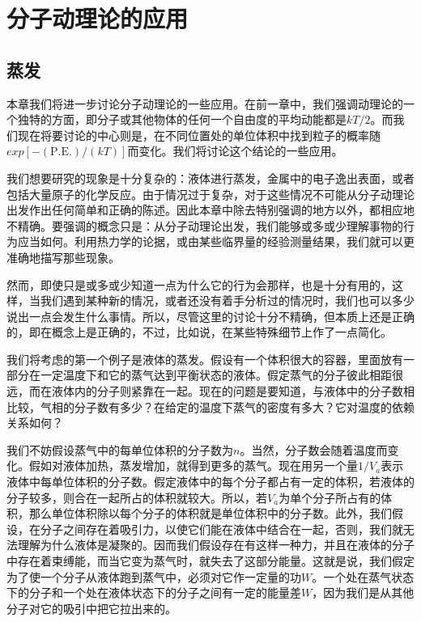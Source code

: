 \chapter{分子动理论的应用}

\section{蒸发}

本章我们将进一步讨论分子动理论的一些应用。在前一章中，我们强调动理论的一个独特的方面，即分子或其他物体的任何一个自由度的平均动能都是$kT/2$。而我们现在将要讨论的中心则是，在不同位置处的单位体积中找到粒子的概率随$exp[-(\text{P.E.})/(kT)]$而变化。我们将讨论这个结论的一些应用。

我们想要研究的现象是十分复杂的：液体进行蒸发，金属中的电子逸出表面，或者包括大量原子的化学反应。由于情况过于复杂，对于这些情况不可能从分子动理论出发作出任何简单和正确的陈述。因此本章中除去特别强调的地方以外，都相应地不精确。要强调的概念只是：从分子动理论出发，我们能够或多或少理解事物的行为应当如何。利用热力学的论据，或由某些临界量的经验测量结果，我们就可以更准确地描写那些现象。

然而，即使只是或多或少知道一点为什么它的行为会那样，也是十分有用的，这样，当我们遇到某种新的情况，或者还没有着手分析过的情况时，我们也可以多少说出一点会发生什么事情。所以，尽管这里的讨论十分不精确，但本质上还是正确的，即在概念上是正确的，不过，比如说，在某些特殊细节上作了一点简化。

我们将考虑的第一个例子是液体的蒸发。假设有一个体积很大的容器，里面放有一部分在一定温度下和它的蒸气达到平衡状态的液体。假定蒸气的分子彼此相距很远，而在液体内的分子则紧靠在一起。现在的问题是要知道，与液体中的分子数相比较，气相的分子数有多少？在给定的温度下蒸气的密度有多大？它对温度的依赖关系如何？

我们不妨假设蒸气中的每单位体积的分子数为$n$。当然，分子数会随着温度而变化。假如对液体加热，蒸发增加，就得到更多的蒸气。现在用另一个量$1/V_a$表示液体中每单位体积的分子数。假定液体中的每个分子都占有一定的体积，若液体的分子较多，则合在一起所占的体积就较大。所以，若$V_a$为单个分子所占有的体积，那么单位体积除以每个分子的体积就是单位体积中的分子数。此外，我们假设，在分子之间存在着吸引力，以使它们能在液体中结合在一起，否则，我们就无法理解为什么液体是凝聚的。因而我们假设存在有这样一种力，并且在液体的分子中存在着束缚能，而当它变为蒸气时，就失去了这部分能量。这就是说，我们假定为了使一个分子从液体跑到蒸气中，必须对它作一定量的功$W$。一个处在蒸气状态下的分子和一个处在液体状态下的分子之间有一定的能量差$W$，因为我们是从其他分子对它的吸引中把它拉出来的。

